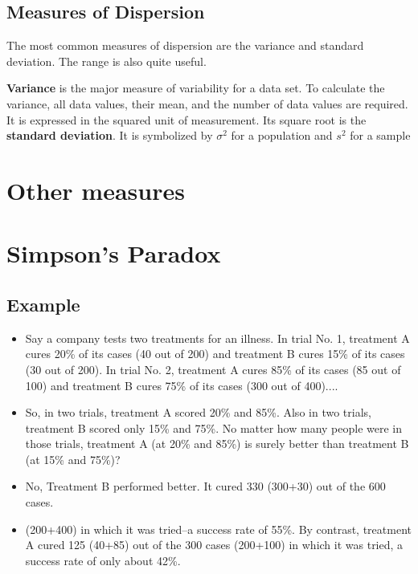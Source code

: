 \subsection{Measures of Dispersion}

The most common measures of dispersion are the variance and standard deviation. The range is also quite useful.

\textbf{Variance} is the major measure of variability for a data set. To calculate the variance, all data values, their mean, and the number of data values are required. It is expressed in the squared unit of measurement. Its square root is the \textbf{standard deviation}. It is symbolized by $\sigma^2$ for a population and $s^2$ for a sample


\newpage
\section{Other measures}
\section{Simpson's Paradox}

\subsection{Example}
\begin{itemize}
\item Say a company tests two treatments for an illness. In trial No. 1, treatment A cures 20\% of its cases (40 out of 200) and treatment B cures 15\% of its cases (30 out of 200). In trial No. 2, treatment A cures 85\% of its cases (85 out of 100) and treatment B cures 75\% of its cases (300 out of 400)....
\item
So, in two trials, treatment A scored 20\% and 85\%. Also in two trials, treatment B scored only 15\% and 75\%. No matter how many people were in those trials, treatment A (at 20\% and 85\%) is surely better than treatment B (at 15\% and 75\%)?
\item
No, Treatment B performed better. It cured 330 (300+30) out of the 600 cases.
\item
(200+400) in which it was tried--a success rate of 55\%. By contrast, treatment A cured 125 (40+85) out of the 300 cases (200+100) in which it was tried, a success rate of only about 42\%.
\end{itemize}

